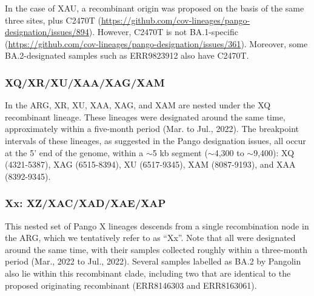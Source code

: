 \documentclass[12pt]{article}
\begin{document}
In the case of XAU, a recombinant origin was proposed
on the basis of the same three sites, plus C2470T
(\url{https://github.com/cov-lineages/pango-designation/issues/894}).
However, C2470T is not BA.1-specific
(\url{https://github.com/cov-lineages/pango-designation/issues/361}).
Moreover, some BA.2-designated samples such as ERR9823912 also have C2470T.



\subsubsection{XQ/XR/XU/XAA/XAG/XAM}
\label{sec:dd_xq}

In the ARG, XR, XU, XAA, XAG, and XAM
are nested under the XQ recombinant lineage.
These lineages were designated around the same time,
approximately within a five-month period (Mar. to Jul., 2022).
The breakpoint intervals of these lineages,
as suggested in the Pango designation issues,
all occur at the 5' end of the genome,
within a $\sim$5 kb segment ($\sim$4,300 to $\sim$9,400):
XQ (4321-5387), %
XAG (6515-8394), %
XU (6517-9345), %
XAM (8087-9193), %
and XAA (8392-9345). %



\subsubsection{Xx: XZ/XAC/XAD/XAE/XAP}
\label{sec:dd_xx}

This nested set of Pango X lineages descends
from a single recombination node in the ARG,
which we tentatively refer to as ``Xx''.
Note that all were designated around the same time,
with their samples collected
roughly within a three-month period (Mar., 2022 to Jul., 2022).
Several samples labelled as BA.2 by Pangolin also lie
within this recombinant clade,
including two that are identical
to the proposed originating recombinant (ERR8146303 and ERR8163061).
\end{document}
